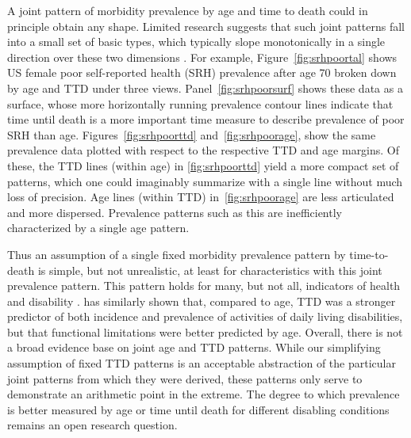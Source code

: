 \documentclass[12pt,oneside,a4paper]{article} %
\begin{document}
A joint pattern of morbidity prevalence by age and time to death could in
principle obtain any shape. Limited research suggests that such joint patterns fall into a small set of basic types, which typically slope monotonically in a single direction over these two dimensions \citep{riffe2017ttd}. For example, Figure~\ref{fig:srhpoortal} shows US female poor self-reported health (SRH) prevalence after age 70 broken down by age and TTD under three views. Panel~\ref{fig:srhpoorsurf} shows these data as a surface, whose more horizontally running prevalence contour lines indicate that time until death is a more important time measure to describe prevalence of poor SRH than age. Figures~\ref{fig:srhpoorttd} and~\ref{fig:srhpoorage}, show the same prevalence data plotted with respect to the respective TTD and age margins. Of these, the TTD lines (within age) in \ref{fig:srhpoorttd} yield a more compact set of patterns, which one could imaginably summarize with a single line without much loss of precision. Age lines (within TTD) in~\ref{fig:srhpoorage} are less articulated and more dispersed. Prevalence patterns such as this are inefficiently characterized by a single age pattern.  

Thus an assumption of a single fixed morbidity prevalence pattern by
time-to-death is simple, but not unrealistic, at least for characteristics with this joint
prevalence pattern. This pattern holds for many, but not all, indicators of
health and disability \citep{riffe2017ttd}. \citet{klijs2010disability} has
similarly shown that, compared to age, TTD was a stronger predictor of both
incidence and prevalence of activities of daily living disabilities, but that
functional limitations were better predicted by age.
Overall, there is not a broad evidence base on joint age and TTD patterns. While our simplifying assumption of fixed TTD patterns is an acceptable abstraction of the particular joint patterns from which they were derived, these patterns only serve to demonstrate an arithmetic point in the extreme. The degree to which prevalence is better measured by age or time until death for different disabling conditions remains an open research question.
\end{document}
